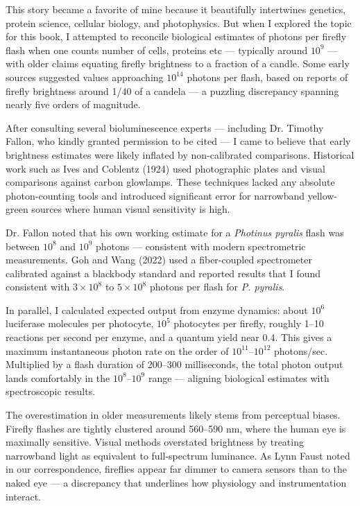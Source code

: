 \begin{commentary}
This story became a favorite of mine because it beautifully intertwines genetics, protein science, cellular biology, and photophysics. But when I explored the topic for this book, I attempted to reconcile biological estimates of photons per firefly flash when one counts number of cells, proteins etc — typically around $10^9$ — with older claims equating firefly brightness to a fraction of a candle. Some early sources suggested values approaching $10^{14}$ photons per flash, based on reports of firefly brightness around 1/40 of a candela — a puzzling discrepancy spanning nearly five orders of magnitude.

After consulting several bioluminescence experts — including Dr. Timothy Fallon, who kindly granted permission to be cited — I came to believe that early brightness estimates were likely inflated by non-calibrated comparisons. Historical work such as Ives and Coblentz (1924) used photographic plates and visual comparisons against carbon glowlamps. These techniques lacked any absolute photon-counting tools and introduced significant error for narrowband yellow-green sources where human visual sensitivity is high.

Dr. Fallon noted that his own working estimate for a \textit{Photinus pyralis} flash was between $10^8$ and $10^9$ photons — consistent with modern spectrometric measurements. Goh and Wang (2022) used a fiber-coupled spectrometer calibrated against a blackbody standard and reported results that I found consistent with $3 \times 10^8$ to $5 \times 10^8$ photons per flash for \textit{P. pyralis}.

In parallel, I calculated expected output from enzyme dynamics: about $10^6$ luciferase molecules per photocyte, $10^5$ photocytes per firefly, roughly 1–10 reactions per second per enzyme, and a quantum yield near 0.4. This gives a maximum instantaneous photon rate on the order of $10^{11}$–$10^{12}$ photons/sec. Multiplied by a flash duration of 200–300 milliseconds, the total photon output lands comfortably in the $10^8$–$10^9$ range — aligning biological estimates with spectroscopic results.

The overestimation in older measurements likely stems from perceptual biases. Firefly flashes are tightly clustered around 560–590 nm, where the human eye is maximally sensitive. Visual methods overstated brightness by treating narrowband light as equivalent to full-spectrum luminance. As Lynn Faust noted in our correspondence, fireflies appear far dimmer to camera sensors than to the naked eye — a discrepancy that underlines how physiology and instrumentation interact.


\end{commentary}
